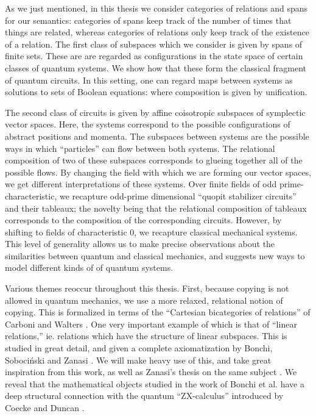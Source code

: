 As we just mentioned, in this thesis we consider categories of relations and spans for our semantics: categories of spans keep track of the number of times that things are related, whereas categories of relations only keep track of the existence of a relation.
The first class of subspaces which we consider is given by spans of finite sets.  These are are regarded as configurations in the state space of certain classes of quantum systems.  We show how that these form the classical fragment of quantum circuits.  In this setting, one can regard maps between systems as solutions to sets of Boolean equations: where composition is given by unification.

The second class of circuits is given by affine coisotropic subspaces of symplectic vector spaces.  Here, the systems correspond to the possible configurations of abstract positions and momenta.  The subspaces between systems are the possible ways in which ``particles'' can flow between both systems.  The relational composition of two of these subspaces corresponds to glueing together all of the possible flows. By changing the field with which we are forming our vector spaces, we get different interpretations of these systems.  Over finite fields of odd prime-characteristic, we recapture odd-prime dimensional ``quopit stabilizer circuits'' and their tableaux; the novelty being that the relational composition of tableaux corresponds to the composition of the corresponding circuits.  However, by shifting to fields of characteristic 0, we recapture classical mechanical systems.  This level of generality allows us to make precise observations about the similarities between quantum and classical mechanics, and suggests new ways to model different kinds of of quantum systems.


Various themes reoccur throughout this thesis.  First, because copying is not allowed in quantum mechanics, we use a more relaxed, relational notion of copying.  This is formalized in terms of the ``Cartesian bicategories of relations''  of Carboni and Walters \cite{carboni}.  One very important example of which is that of ``linear relations,'' ie. relations which have the structure of linear subspaces.  This is studied in great detail, and given a complete axiomatization by Bonchi, Soboci{\'n}ski and Zanasi \cite{ihpub}.  We will make heavy use of this, and take great inspiration from this work, as well as  Zanasi's thesis on the same subject \cite{ih}.  We reveal that the mathematical objects studied in the work of Bonchi et al. have a deep structural connection with the quantum ``ZX-calculus'' introduced by Coecke and Duncan \cite{coecke2008interacting}.



